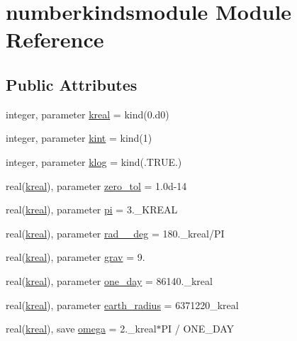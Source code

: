 \hypertarget{classnumberkindsmodule}{\section{numberkindsmodule Module Reference}
\label{classnumberkindsmodule}
}
\subsection*{Public Attributes}
\begin{DoxyCompactItemize}
\item 
integer, parameter \hyperlink{classnumberkindsmodule_acb7e3fe921df90acbc66762b69413be6}{kreal} = kind(0.d0)
\item 
integer, parameter \hyperlink{classnumberkindsmodule_a50957e2e9ebdf9a5c6da0641adf3a1b3}{kint} = kind(1)
\item 
integer, parameter \hyperlink{classnumberkindsmodule_a4e700e028ecf89d8d338fb96bf5d2ee8}{klog} = kind(.T\+R\+U\+E.)
\item 
real(\hyperlink{classnumberkindsmodule_acb7e3fe921df90acbc66762b69413be6}{kreal}), parameter \hyperlink{classnumberkindsmodule_a55d20f06f159cd32c956d990e1e8d09b}{zero\+\_\+tol} = 1.\+0d-\/14
\item 
real(\hyperlink{classnumberkindsmodule_acb7e3fe921df90acbc66762b69413be6}{kreal}), parameter \hyperlink{classnumberkindsmodule_a5245bdece2ae8cdc7ed51106c7159d1e}{pi} = 3.\+\_\+\+K\+R\+E\+A\+L
\item 
real(\hyperlink{classnumberkindsmodule_acb7e3fe921df90acbc66762b69413be6}{kreal}), parameter \hyperlink{classnumberkindsmodule_aadb33c76ca6311bf704590f5fe6fcb03}{rad\+\_\+\_\+deg} = 180.\+\_\+kreal/\+P\+I
\item 
real(\hyperlink{classnumberkindsmodule_acb7e3fe921df90acbc66762b69413be6}{kreal}), parameter \hyperlink{classnumberkindsmodule_a3fa35bfeabc89820eedbd3cb234860c0}{grav} = 9.
\item 
real(\hyperlink{classnumberkindsmodule_acb7e3fe921df90acbc66762b69413be6}{kreal}), parameter \hyperlink{classnumberkindsmodule_a17524d8d05103095fa941ef39ed6d386}{one\+\_\+day} = 86140.\+\_\+kreal
\item 
real(\hyperlink{classnumberkindsmodule_acb7e3fe921df90acbc66762b69413be6}{kreal}), parameter \hyperlink{classnumberkindsmodule_a7a11e66fa6f857a8228f12a7c76ca69c}{earth\+\_\+radius} = 6371220\+\_\+kreal
\item 
real(\hyperlink{classnumberkindsmodule_acb7e3fe921df90acbc66762b69413be6}{kreal}), save \hyperlink{classnumberkindsmodule_a924b4999227b1dfbd01844eaf4485508}{omega} = 2.\+\_\+kreal$\ast$\+P\+I / O\+N\+E\+\_\+\+D\+A\+Y

\end{DoxyCompactItemize}

